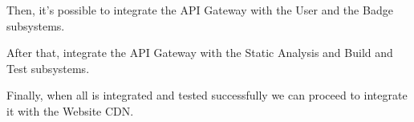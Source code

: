 \begin{adjustbox}{
        max size={\textwidth}{},
        center,
        caption={API Gateway subsystem step 1},
        label={fig:API Gateway subsystem step 1},
        figure=H}
\end{adjustbox}

Then, it's possible to integrate the API Gateway with the User and the Badge subsystems.


\begin{adjustbox}{
        max size={\textwidth}{},
        center,
        caption={API Gateway subsystem step 2},
        label={fig:API Gateway subsystem step 2},
        figure=H}
\end{adjustbox}

After that, integrate the API Gateway with the Static Analysis and Build and Test subsystems.

\begin{adjustbox}{
        max size={\textwidth}{},
        center,
        caption={API Gateway subsystem step 3},
        label={fig:API Gateway subsystem step 3},
        figure=H}
\end{adjustbox}

Finally, when all is integrated and tested successfully we can proceed to integrate it with the Website CDN.

\begin{adjustbox}{
        max size={\textwidth}{},
        center,
        caption={API Gateway subsystem step 4},
        label={fig:API Gateway subsystem step 4},
        figure=H}
\end{adjustbox}